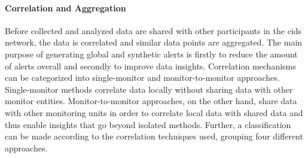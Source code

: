 \paragraph{Correlation and Aggregation}\label{par:correlation_and_aggregation} Before collected and analyzed data are shared with other participants in the \gls{cids} network, the data is correlated and similar data points are aggregated. The main purpose of generating global and synthetic alerts is firstly to reduce the amount of alerts overall and secondly to improve data insights. Correlation mechanisms can be categorized into single-monitor and monitor-to-monitor approaches. Single-monitor methods correlate data locally without sharing data with other monitor entities. Monitor-to-monitor approaches, on the other hand, share data with other monitoring units in order to correlate local data with shared data and thus enable insights that go beyond isolated methods. Further, a classification can be made according to the correlation techniques used, grouping four different approaches.
